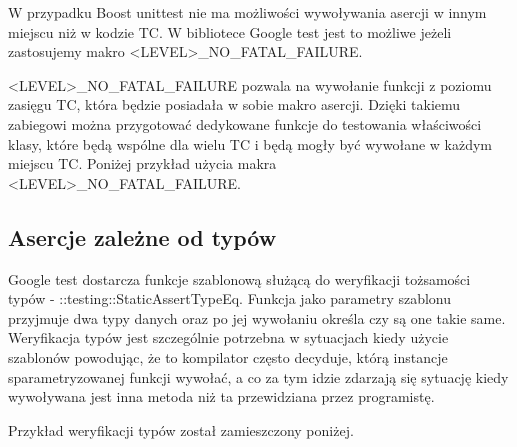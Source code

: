 \documentclass[12pt,a4paper,notitlepage]{report}
\begin{document}
W przypadku Boost unittest nie ma możliwości wywoływania asercji w innym miejscu niż w kodzie TC. W bibliotece Google test jest to możliwe jeżeli zastosujemy makro <LEVEL>{\_}NO{\_}FATAL{\_}FAILURE.

<LEVEL>{\_}NO{\_}FATAL{\_}FAILURE pozwala na wywołanie funkcji z poziomu zasięgu TC, która będzie posiadała w sobie makro asercji. Dzięki takiemu zabiegowi można przygotować dedykowane funkcje do testowania właściwości klasy, które będą wspólne dla wielu TC i będą mogły być wywołane w każdym miejscu TC. Poniżej przykład użycia makra <LEVEL>{\_}NO{\_}FATAL{\_}FAILURE.

			

\subsection{Asercje zależne od typów}

Google test dostarcza funkcje szablonową służącą do weryfikacji tożsamości typów - ::testing::StaticAssertTypeEq. Funkcja jako parametry szablonu przyjmuje dwa typy danych oraz po jej wywołaniu określa czy są one takie same.
Weryfikacja typów jest szczególnie potrzebna w sytuacjach kiedy użycie szablonów powodując, że to kompilator często decyduje, którą instancje sparametryzowanej funkcji wywołać, a co za tym idzie zdarzają się sytuację kiedy wywoływana jest inna metoda niż ta przewidziana przez programistę.

Przykład weryfikacji typów został zamieszczony poniżej.

			

			
\end{document}
